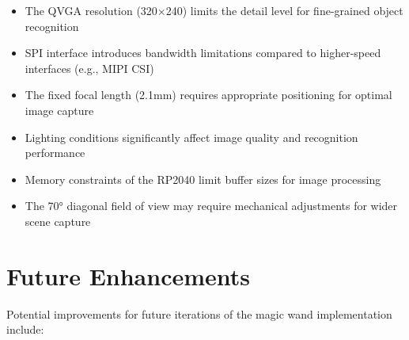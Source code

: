 \begin{itemize}
    
    
    
    \item The QVGA resolution (320×240) limits the detail level for fine-grained object recognition
    
    
    
    \item SPI interface introduces bandwidth limitations compared to higher-speed interfaces (e.g., MIPI CSI)
    
    
    
    \item The fixed focal length (2.1mm) requires appropriate positioning for optimal image capture
    
    
    
    \item Lighting conditions significantly affect image quality and recognition performance
    
    
    
    \item Memory constraints of the RP2040 limit buffer sizes for image processing
    
    
    
    \item The 70° diagonal field of view may require mechanical adjustments for wider scene capture
    
    
    
\end{itemize}







\section{Future Enhancements}



Potential improvements for future iterations of the magic wand implementation include:



